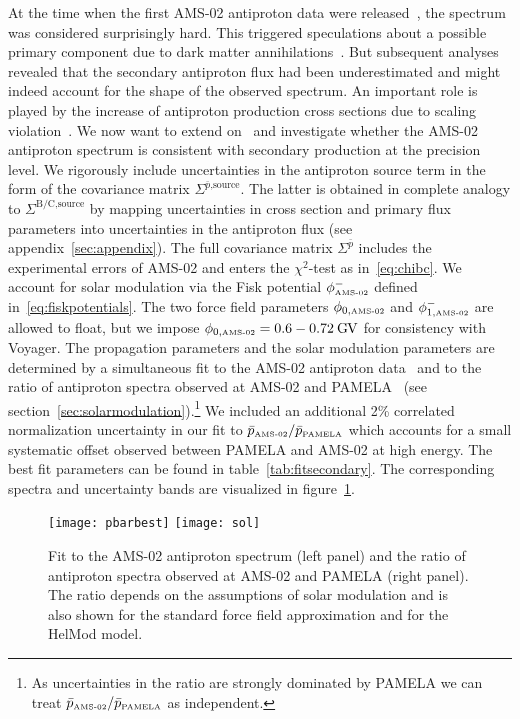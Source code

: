 \documentclass[a4paper,11pt]{article}
\newcommand{\eVdist}{\kern-0.06em}
\newcommand{\gv}{\:\text{G\eVdist V}}
\begin{document}
At the time when the first AMS-02 antiproton data were released~\cite{tingtalk:2015}, the spectrum was considered surprisingly hard. This triggered speculations about a possible primary component due to dark matter annihilations~\cite{Hamaguchi:2015wga,Lin:2015taa,Chen:2015kla}. But subsequent analyses revealed that the secondary antiproton flux had been underestimated and might indeed account for the shape of the observed spectrum. An important role is played by the increase of antiproton production cross sections due to scaling violation~\cite{Kachelriess:2015wpa,Winkler:2017xor}. We now want to extend on~\cite{Winkler:2017xor} and investigate whether the AMS-02 antiproton spectrum is consistent with secondary production at the precision level. We rigorously include uncertainties in the antiproton source term in the form of the covariance matrix $\Sigma^\text{$\bar{p}$,source}$. The latter is obtained in complete analogy to $\Sigma^\text{B/C,source}$ by mapping uncertainties in cross section and primary flux parameters into uncertainties in the antiproton flux (see appendix~\ref{sec:appendix}). The full covariance matrix $\Sigma^\text{$\bar{p}$}$ includes the experimental errors of AMS-02 and enters the $\chi^2$-test as in~\eqref{eq:chibc}. We account for solar modulation via the Fisk potential $\phi^-_{\text{\tiny{AMS-02}}}$ defined in~\eqref{eq:fiskpotentials}.
The two force field parameters $\phi_{0,\text{\tiny{AMS-02}}}$ and $\phi_{1,\text{\tiny{AMS-02}}}^-$ are allowed to float, but we impose $\phi_{0,\text{\tiny{AMS-02}}}=0.6-0.72\gv$ for consistency with Voyager. The propagation parameters and the solar modulation parameters are determined by a simultaneous fit to the AMS-02 antiproton data~\cite{Aguilar:2016kjl} and to the ratio of antiproton spectra observed at AMS-02 and PAMELA~\cite{Adriani:2012paa} (see section~\ref{sec:solarmodulation}).\footnote{As uncertainties in the ratio are strongly dominated by PAMELA we can treat $\bar{p}_{\text{\tiny{AMS-02}}}/\bar{p}_{\text{\tiny{PAMELA}}}$ as independent.} 
We included an additional 2\% correlated normalization uncertainty in our fit to $\bar{p}_{\text{\tiny{AMS-02}}}/\bar{p}_{\text{\tiny{PAMELA}}}$ which accounts for a small systematic offset observed between PAMELA and AMS-02 at high energy. The best fit parameters can be found in table~\ref{tab:fitsecondary}. The corresponding spectra and uncertainty bands are visualized in figure~\ref{fig:pbar}.

\begin{figure}[htp]
\begin{center}
  \texttt{[image: pbarbest]}\hspace{3mm}
  \texttt{[image: sol]}
\end{center}
\caption{Fit to the AMS-02 antiproton spectrum (left panel) and the ratio of antiproton spectra observed at AMS-02 and PAMELA (right panel). The ratio depends on the assumptions of solar modulation and is also shown for the standard force field approximation and for the HelMod model.}
\label{fig:pbar}
\end{figure}
\end{document}
